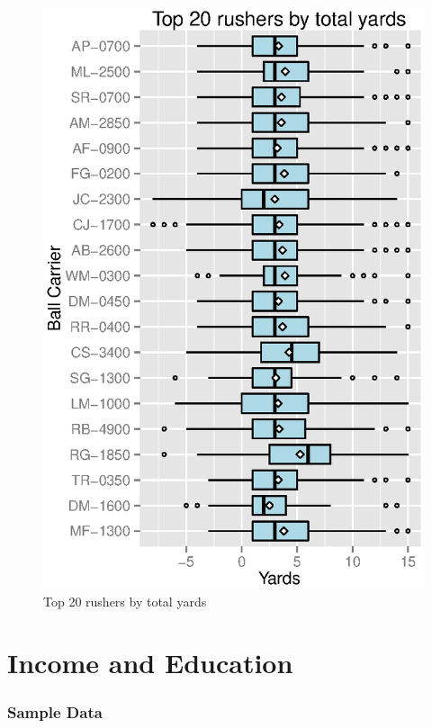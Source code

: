 \documentclass{exam}
\begin{document}
  \begin{figure}[H]
    \centering
    \includegraphics{figures/nfl/top_rushers.eps}
    \caption{Top 20 rushers by total yards}
  \end{figure}

  \part{Income and Education}

  \section{Sample Data}
\end{document}
